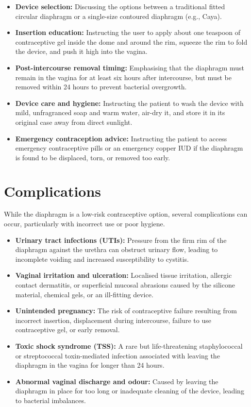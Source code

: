 \begin{itemize}
    \item \textbf{Device selection:} Discussing the options between a traditional fitted circular diaphragm or a single-size contoured diaphragm (e.g., Caya).
    \item \textbf{Insertion education:} Instructing the user to apply about one teaspoon of contraceptive gel inside the dome and around the rim, squeeze the rim to fold the device, and push it high into the vagina.
    \item \textbf{Post-intercourse removal timing:} Emphasising that the diaphragm must remain in the vagina for at least six hours after intercourse, but must be removed within 24 hours to prevent bacterial overgrowth.
    \item \textbf{Device care and hygiene:} Instructing the patient to wash the device with mild, unfragranced soap and warm water, air-dry it, and store it in its original case away from direct sunlight.
    \item \textbf{Emergency contraception advice:} Instructing the patient to access emergency contraceptive pills or an emergency copper IUD if the diaphragm is found to be displaced, torn, or removed too early.
\end{itemize}

\section*{Complications}
While the diaphragm is a low-risk contraceptive option, several complications can occur, particularly with incorrect use or poor hygiene.

\begin{itemize}
    \item \textbf{Urinary tract infections (UTIs):} Pressure from the firm rim of the diaphragm against the urethra can obstruct urinary flow, leading to incomplete voiding and increased susceptibility to cystitis.
    \item \textbf{Vaginal irritation and ulceration:} Localised tissue irritation, allergic contact dermatitis, or superficial mucosal abrasions caused by the silicone material, chemical gels, or an ill-fitting device.
    \item \textbf{Unintended pregnancy:} The risk of contraceptive failure resulting from incorrect insertion, displacement during intercourse, failure to use contraceptive gel, or early removal.
    \item \textbf{Toxic shock syndrome (TSS):} A rare but life-threatening staphylococcal or streptococcal toxin-mediated infection associated with leaving the diaphragm in the vagina for longer than 24 hours.
    \item \textbf{Abnormal vaginal discharge and odour:} Caused by leaving the diaphragm in place for too long or inadequate cleaning of the device, leading to bacterial imbalances.
\end{itemize}

